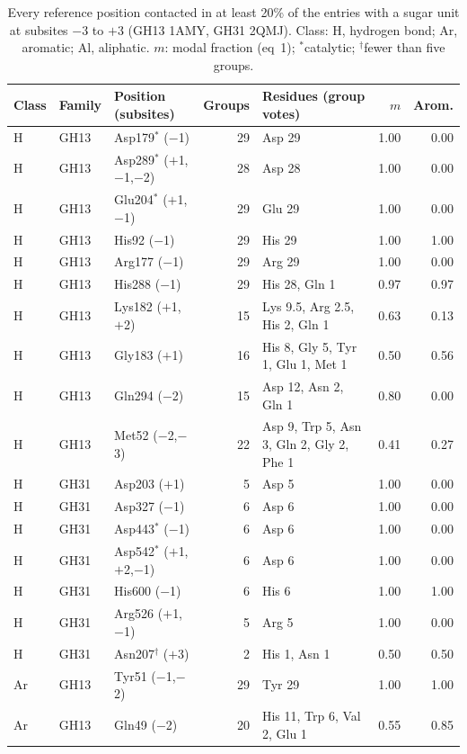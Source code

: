 \documentclass[preprint,12pt]{elsarticle}
\begin{document}
\begin{table}[p]
\centering\renewcommand{\baselinestretch}{1}\renewcommand{\arraystretch}{0.85}\scriptsize\setlength{\tabcolsep}{3pt}
\caption{Every reference position contacted in at least 20\% of the entries with a sugar unit at subsites $-3$ to $+3$ (GH13 1AMY, GH31 2QMJ). Class: H, hydrogen bond; Ar, aromatic; Al, aliphatic. $m$: modal fraction (eq~1); $^\ast$catalytic; $^\dagger$fewer than five groups.}
\label{tab:positions}
\begin{tabular}{lllrp{4.6cm}rr}
\toprule
Class & Family & Position (subsites) & Groups & Residues (group votes) & $m$ & Arom.\\
\midrule
H & GH13 & Asp179$^\ast$ ($-$1) & 29 & Asp 29 & 1.00 & 0.00\\
H & GH13 & Asp289$^\ast$ ($+$1,$-$1,$-$2) & 28 & Asp 28 & 1.00 & 0.00\\
H & GH13 & Glu204$^\ast$ ($+$1,$-$1) & 29 & Glu 29 & 1.00 & 0.00\\
H & GH13 & His92 ($-$1) & 29 & His 29 & 1.00 & 1.00\\
H & GH13 & Arg177 ($-$1) & 29 & Arg 29 & 1.00 & 0.00\\
H & GH13 & His288 ($-$1) & 29 & His 28, Gln 1 & 0.97 & 0.97\\
H & GH13 & Lys182 ($+$1,$+$2) & 15 & Lys 9.5, Arg 2.5, His 2, Gln 1 & 0.63 & 0.13\\
H & GH13 & Gly183 ($+$1) & 16 & His 8, Gly 5, Tyr 1, Glu 1, Met 1 & 0.50 & 0.56\\
H & GH13 & Gln294 ($-$2) & 15 & Asp 12, Asn 2, Gln 1 & 0.80 & 0.00\\
H & GH13 & Met52 ($-$2,$-$3) & 22 & Asp 9, Trp 5, Asn 3, Gln 2, Gly 2, Phe 1 & 0.41 & 0.27\\
H & GH31 & Asp203 ($+$1) & 5 & Asp 5 & 1.00 & 0.00\\
H & GH31 & Asp327 ($-$1) & 6 & Asp 6 & 1.00 & 0.00\\
H & GH31 & Asp443$^\ast$ ($-$1) & 6 & Asp 6 & 1.00 & 0.00\\
H & GH31 & Asp542$^\ast$ ($+$1,$+$2,$-$1) & 6 & Asp 6 & 1.00 & 0.00\\
H & GH31 & His600 ($-$1) & 6 & His 6 & 1.00 & 1.00\\
H & GH31 & Arg526 ($+$1,$-$1) & 5 & Arg 5 & 1.00 & 0.00\\
H & GH31 & Asn207$^\dagger$ ($+$3) & 2 & His 1, Asn 1 & 0.50 & 0.50\\
\midrule
Ar & GH13 & Tyr51 ($-$1,$-$2) & 29 & Tyr 29 & 1.00 & 1.00\\
Ar & GH13 & Gln49 ($-$2) & 20 & His 11, Trp 6, Val 2, Glu 1 & 0.55 & 0.85\\

\end{tabular}
\end{table}
\end{document}
